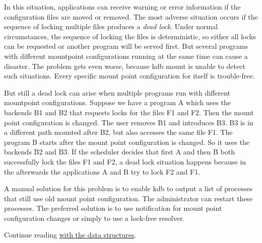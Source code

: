 In this situation, applications can receive warning or error information if the configuration files are moved or removed. The most adverse situation occurs if the sequence of locking multiple files produces a {\itshape dead lock}. Under normal circumstances, the sequence of locking the files is deterministic, so either all locks can be requested or another program will be served first. But several programs with different mountpoint configurations running at the same time can cause a disaster. The problem gets even worse, because {\ttfamily kdb mount} is unable to detect such situations. Every specific mount point configuration for itself is trouble-\/free.

But still a dead lock can arise when multiple programs run with different mountpoint configurations. Suppose we have a program {\ttfamily A} which uses the backends {\ttfamily B1} and {\ttfamily B2} that requests locks for the files {\ttfamily F1} and {\ttfamily F2}. Then the mount point configuration is changed. The user removes {\ttfamily B1} and introduces {\ttfamily B3}. {\ttfamily B3} is in a different path mounted after {\ttfamily B2}, but also accesses the same file {\ttfamily F1}. The program {\ttfamily B} starts after the mount point configuration is changed. So it uses the backends {\ttfamily B2} and {\ttfamily B3}. If the scheduler decides that first {\ttfamily A} and then {\ttfamily B} both successfully lock the files {\ttfamily F1} and {\ttfamily F2}, a dead lock situation happens because in the afterwards the applications {\ttfamily A} and {\ttfamily B} try to lock {\ttfamily F2} and {\ttfamily F1}.

A manual solution for this problem is to enable {\ttfamily kdb} to output a list of processes that still use old mount point configuration. The administrator can restart these processes. The preferred solution is to use notification for mount point configuration changes or simply to use a lock-\/free resolver.

Continue reading \hyperlink{doc_dev_data-structures_md}{with the data structures}. 